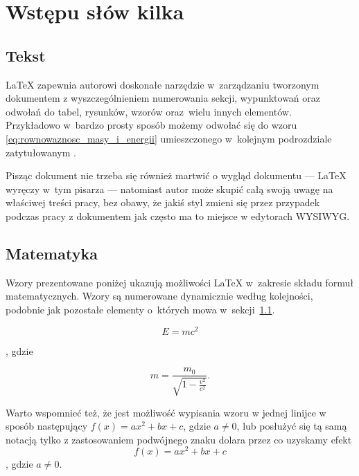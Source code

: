 \chapter{Wstępu słów kilka}
\label{cha:wstepu_slow_kilka}


\section{Tekst}
\label{sec:tekst}
\LaTeX{} zapewnia autorowi doskonałe narzędzie w~zarządzaniu tworzonym dokumentem z wyszczególnieniem numerowania sekcji, wypunktowań oraz odwołań do tabel, rysunków, wzorów oraz~wielu innych elementów. \\
Przykładowo w~bardzo prosty sposób możemy odwołać się do wzoru \ref{eq:rownowaznosc_masy_i_energii} umieszczonego w~kolejnym podrozdziale zatytułowanym .

Pisząc dokument nie trzeba się również martwić o wygląd dokumentu --- \LaTeX{} wyręczy w~tym pisarza --- natomiast autor może skupić całą swoją uwagę na właściwej treści pracy, bez obawy, że jakiś styl zmieni się przez przypadek podczas pracy z dokumentem jak często ma to miejsce w edytorach WYSIWYG.


\section{Matematyka}
\label{sec:matematyka}
Wzory prezentowane poniżej ukazują możliwości \LaTeX{} w~zakresie składu formuł matematycznych. Wzory są numerowane dynamicznie według kolejności, podobnie jak pozostałe elementy o~których mowa w~sekcji~\ref{sec:tekst}.

\begin{equation}
    \label{eq:rownowaznosc_masy_i_energii}
    E = mc^2
\end{equation}

, gdzie

\begin{equation}
    m = \frac{m_0}{\sqrt{1-\frac{v^2}{c^2}}}.
\end{equation}

Warto wspomnieć też, że jest możliwość wypisania wzoru w jednej linijce w sposób następujący $f(x) = ax^2 + bx + c$, gdzie $a \ne 0$, lub posłużyć się tą samą notacją tylko z zastosowaniem podwójnego znaku dolara przez co uzyskamy efekt $$f(x) = ax^2 + bx + c$$, gdzie $a \ne 0$. \\

